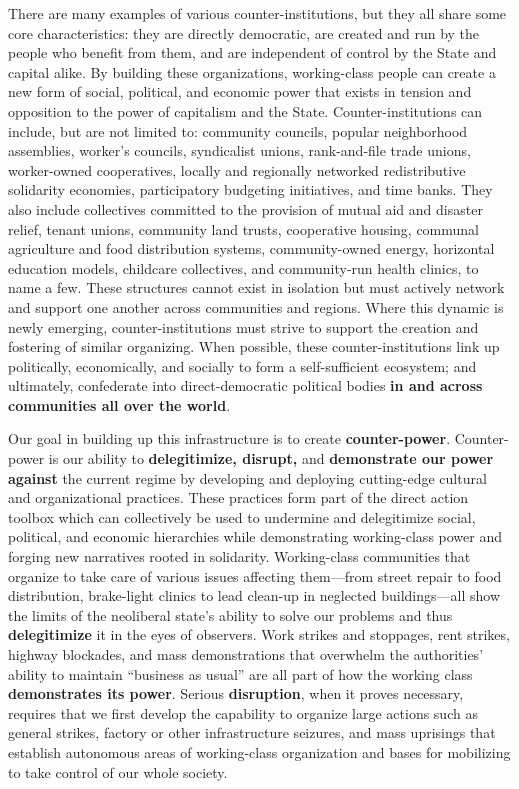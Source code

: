 \documentclass[10pt]{memoir}
\begin{document}
There are many examples of various counter-institutions, but they all
share some core characteristics: they are directly democratic, are
created and run by the people who benefit from them, and are independent
of control by the State and capital alike. By building these
organizations, working-class people can create a new form of social,
political, and economic power that exists in tension and opposition to
the power of capitalism and the State. Counter-institutions can include,
but are not limited to: community councils, popular neighborhood
assemblies, worker's councils, syndicalist unions, rank-and-file trade
unions, worker-owned cooperatives, locally and regionally networked
redistributive solidarity economies, participatory budgeting
initiatives, and time banks. They also include collectives committed to
the provision of mutual aid and disaster relief, tenant unions,
community land trusts, cooperative housing, communal agriculture and
food distribution systems, community-owned energy, horizontal education
models, childcare collectives, and community-run health clinics, to name
a few. These structures cannot exist in isolation but must actively
network and support one another across communities and regions. Where
this dynamic is newly emerging, counter-institutions must strive to
support the creation and fostering of similar organizing. When possible,
these counter-institutions link up politically, economically, and
socially to form a self-sufficient ecosystem; and ultimately,
confederate into direct-democratic political bodies \textbf{in and
across communities all over the world}.

Our goal in building up this infrastructure is to create
\textbf{counter-power}. Counter-power is our ability to
\textbf{delegitimize, disrupt,} and \textbf{demonstrate our power
against} the current regime by developing and deploying cutting-edge
cultural and organizational practices. These practices form part of the
direct action toolbox which can collectively be used to undermine and
delegitimize social, political, and economic hierarchies while
demonstrating working-class power and forging new narratives rooted in
solidarity. Working-class communities that organize to take care of
various issues affecting them---from street repair to food distribution,
brake-light clinics to lead clean-up in neglected buildings---all show
the limits of the neoliberal state's ability to solve our problems and
thus \textbf{delegitimize} it in the eyes of observers. Work strikes and
stoppages, rent strikes, highway blockades, and mass demonstrations that
overwhelm the authorities' ability to maintain ``business as usual'' are
all part of how the working class \textbf{demonstrates its power}.
Serious \textbf{disruption}, when it proves necessary, requires that we
first develop the capability to organize large actions such as general
strikes, factory or other infrastructure seizures, and mass uprisings
that establish autonomous areas of working-class organization and bases
for mobilizing to take control of our whole society.
\end{document}
